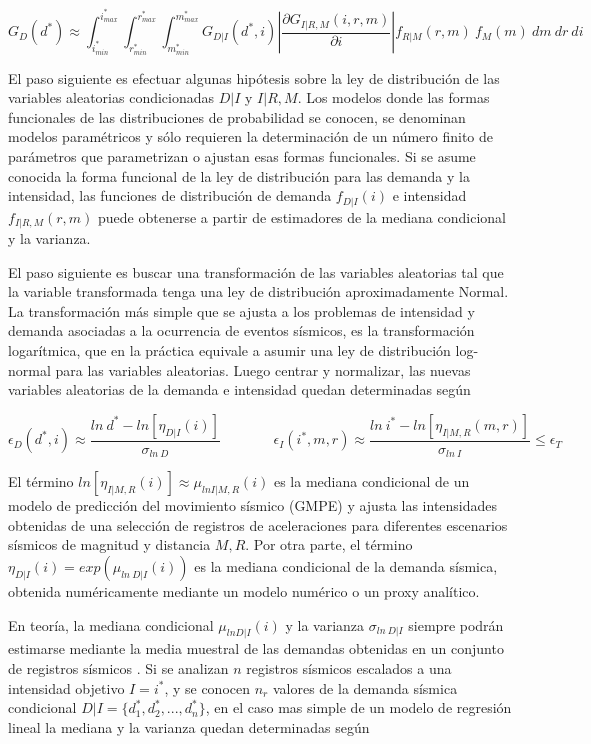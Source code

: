 \documentclass[
]{krantz}
\begin{document}
\[ \begin{equation} 
G_D(d^*) \approx \int^{i_{max}^*}_{i_{min}^*} \int^{r_{max}^*}_{r_{min}^*}  \int^{m_{max}^*}_{m_{min}^*} G_{D|I}(d^*,i) \left | \frac{\partial G_{I|R,M}(i,r,m)}{\partial i} \right |f_{R|M}(r,m) \ f_M(m)  \ dm \ dr \ di
\end{equation}\]

El paso siguiente es efectuar algunas hipótesis sobre la ley de distribución de las variables aleatorias condicionadas \(D|I\) y \(I|R,M\). Los modelos donde las formas funcionales de las distribuciones de probabilidad se conocen, se denominan modelos paramétricos y sólo requieren la determinación de un número finito de parámetros que parametrizan o ajustan esas formas funcionales. Si se asume conocida la forma funcional de la ley de distribución para las demanda y la intensidad, las funciones de distribución de demanda \(f_{D|I}(i)\) e intensidad \(f_{I|R,M}(r,m)\) puede obtenerse a partir de estimadores de la mediana condicional y la varianza.

El paso siguiente es buscar una transformación de las variables aleatorias tal que la variable transformada tenga una ley de distribución aproximadamente Normal. La transformación más simple que se ajusta a los problemas de intensidad y demanda asociadas a la ocurrencia de eventos sísmicos, es la transformación logarítmica, que en la práctica equivale a asumir una ley de distribución log-normal para las variables aleatorias. Luego centrar y normalizar, las nuevas variables aleatorias de la demanda e intensidad quedan determinadas según

\[ \begin{equation} 
\epsilon_{D}(d^*,i) \approx  \frac{ln\ d^*-ln [\eta_{D|I}(i)]}{\sigma_{ln \ D} }  \ \ \ \ \ \ \ \ \ \ \ \ \ \ \ \ \ \epsilon_{I}(i^*,m,r) \approx  \frac{ln \ i^*-ln[\eta_{I|M,R}(m,r)]}{\sigma_{ln \ I} } \leq \epsilon_{T}
\end{equation}\]

El término \(ln [\eta_{I|M,R}(i)] \approx \mu_{ln I|M,R}(i)\) es la mediana condicional de un modelo de predicción del movimiento sísmico (GMPE) y ajusta las intensidades obtenidas de una selección de registros de aceleraciones para diferentes escenarios sísmicos de magnitud y distancia \({M,R}\). Por otra parte, el término \(\eta_{D|I}(i)=exp(\mu_{ln \ D|I}(i))\) es la mediana condicional de la demanda sísmica, obtenida numéricamente mediante un modelo numérico o un proxy analítico.

En teoría, la mediana condicional \(\mu_{ln D|I}(i)\) y la varianza \(\sigma_{ln \ D|I}\) siempre podrán estimarse mediante la media muestral de las demandas obtenidas en un conjunto de registros sísmicos . Si se analizan \(n\) registros sísmicos escalados a una intensidad objetivo \(I=i^*\), y se conocen \(n_r\) valores de la demanda sísmica condicional \(D|I = \{d_1^*,d_2^*,...,d_{n}^* \}\), en el caso mas simple de un modelo de regresión lineal la mediana y la varianza quedan determinadas según
\end{document}
